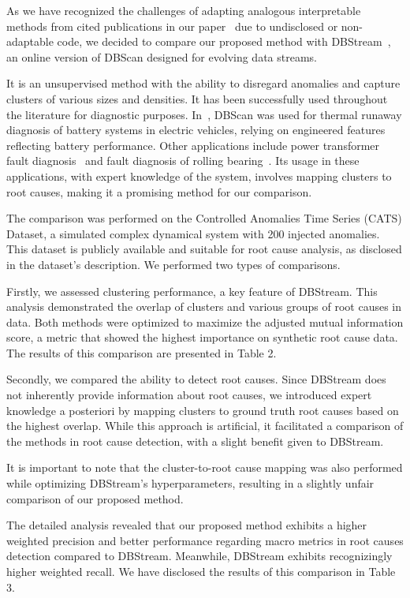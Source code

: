 \documentclass{article}
\begin{document}
\begin{enumerate}
        As we have recognized the challenges of adapting analogous interpretable methods from cited publications in our paper~\cite{Yang2022, Steenwinckel2021} due to undisclosed or non-adaptable code, we decided to compare our proposed method with DBStream~\cite{Hahsler2016}, an online version of DBScan designed for evolving data streams.

        It is an unsupervised method with the ability to disregard anomalies and capture clusters of various sizes and densities. It has been successfully used throughout the literature for diagnostic purposes. In~\cite{Li2019}, DBScan was used for thermal runaway diagnosis of battery systems in electric vehicles, relying on engineered features reflecting battery performance. Other applications include power transformer fault diagnosis~\cite{Liu2020} and fault diagnosis of rolling bearing~\cite{Li2020}.
        Its usage in these applications, with expert knowledge of the system, involves mapping clusters to root causes, making it a promising method for our comparison.

        The comparison was performed on the Controlled Anomalies Time Series (CATS) Dataset, a simulated complex dynamical system with 200 injected anomalies. This dataset is publicly available and suitable for root cause analysis, as disclosed in the dataset's description. We performed two types of comparisons.

        Firstly, we assessed clustering performance, a key feature of DBStream. This analysis demonstrated the overlap of clusters and various groups of root causes in data. Both methods were optimized to maximize the adjusted mutual information score, a metric that showed the highest importance on synthetic root cause data. The results of this comparison are presented in Table 2.

        Secondly, we compared the ability to detect root causes. Since DBStream does not inherently provide information about root causes, we introduced expert knowledge a posteriori by mapping clusters to ground truth root causes based on the highest overlap. While this approach is artificial, it facilitated a comparison of the methods in root cause detection, with a slight benefit given to DBStream.

        It is important to note that the cluster-to-root cause mapping was also performed while optimizing DBStream's hyperparameters, resulting in a slightly unfair comparison of our proposed method.

        The detailed analysis revealed that our proposed method exhibits a higher weighted precision and better performance regarding macro metrics in root causes detection compared to DBStream. Meanwhile, DBStream exhibits recognizingly higher weighted recall. We have disclosed the results of this comparison in Table 3.


\end{enumerate}
\end{document}
